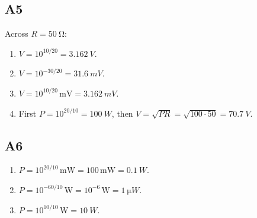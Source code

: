 \documentclass[12pt,a4paper]{article}
\begin{document}
\subsection{A5}
Across $R=\SI{50}{\ohm}$:
\begin{enumerate}[label=\alph*)]
\item $V=10^{10/20}=\SI{3.162}{V}$.
\item $V=10^{-30/20}=\SI{31.6}{mV}$.
\item $V=10^{10/20}\,\text{mV}=\SI{3.162}{mV}$.
\item First $P=10^{20/10}=\SI{100}{W}$, then $V=\sqrt{PR}=\sqrt{100\cdot50}=\SI{70.7}{V}$.
\end{enumerate}

\subsection{A6}
\begin{enumerate}[label=\alph*)]
\item $P=10^{20/10}\,\text{mW}=100\,\text{mW}=\SI{0.1}{W}$.
\item $P=10^{-60/10}\,\text{W}=10^{-6}\,\text{W}=\SI{1}{\micro W}$.
\item $P=10^{10/10}\,\text{W}=\SI{10}{W}$.
\end{enumerate}
\end{document}
